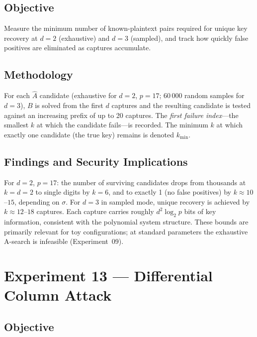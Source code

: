 \documentclass[12pt,a4paper]{article}
\theoremstyle{definition}
\begin{document}
\subsection{Objective}

Measure the minimum number of known-plaintext pairs required for
unique key recovery at $d = 2$ (exhaustive) and $d = 3$ (sampled),
and track how quickly false positives are eliminated as captures
accumulate.

\subsection{Methodology}

For each $\hat{A}$ candidate (exhaustive for $d = 2$, $p = 17$;
60\,000 random samples for $d = 3$), $B$ is solved from the first
$d$ captures and the resulting candidate is tested against an
increasing prefix of up to 20 captures. The \emph{first failure
index}---the smallest $k$ at which the candidate fails---is recorded.
The minimum $k$ at which exactly one candidate (the true key) remains
is denoted $k_{\min}$.

\subsection{Findings and Security Implications}

For $d = 2$, $p = 17$: the number of surviving candidates drops from
thousands at $k = d = 2$ to single digits by $k = 6$, and to exactly
1 (no false positives) by $k \approx 10$--$15$, depending on
$\sigma$. For $d = 3$ in sampled mode, unique recovery is achieved by
$k \approx 12$--$18$ captures. Each capture carries roughly
$d^2 \log_2 p$ bits of key information, consistent with the
polynomial system structure. These bounds are primarily relevant for
toy configurations; at standard parameters the exhaustive A-search
is infeasible (Experiment~09).

\section{Experiment 13 --- Differential Column Attack}

\subsection{Objective}
\end{document}
